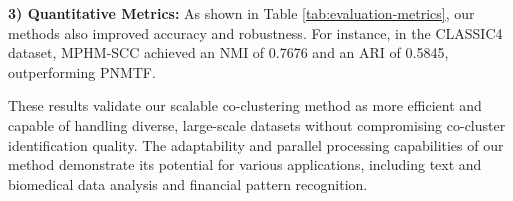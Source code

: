 \textbf{3) Quantitative Metrics:} As shown in Table \ref{tab:evaluation-metrics}, our methods also improved accuracy and robustness. For instance, in the CLASSIC4 dataset, MPHM-SCC achieved an NMI of 0.7676 and an ARI of 0.5845, outperforming PNMTF.

These results validate our scalable co-clustering method as more efficient and capable of handling diverse, large-scale datasets without compromising co-cluster identification quality. The adaptability and parallel processing capabilities of our method demonstrate its potential for various applications, including text and biomedical data analysis and financial pattern recognition.
